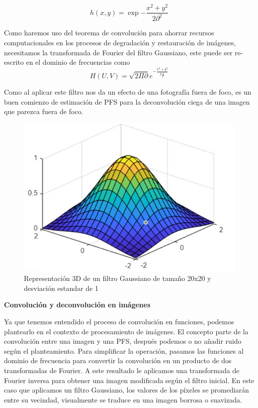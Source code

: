 \documentclass[eng]{ajceam-class}
\begin{document}
\begin{equation}
    h(x,y) = \exp{-\frac{x^2+y^2}{2\partial ^2}}
\end{equation}

Como haremos uso del teorema de convolución para ahorrar recursos computacionales en los procesos de degradación y restauración de imágenes, necesitamos la transformada de Fourier del filtro Gaussiano, este puede ser re-escrito en el dominio de frecuencias como
\begin{equation}
    H(U,V) = \sqrt{2\Pi \partial}e^{-\frac{x^2+y^2}{2\frac{1}{\delta^2}}}
\end{equation}

Como al aplicar este filtro nos da un efecto de una fotografía fuera de foco, es un buen comienzo de estimación de PFS para la deconvolución ciega de una imagen que parezca fuera de foco. \cite{Menaka_2021}

\begin{figure}[!h] 
 \centering
 \includegraphics[width=.8\columnwidth]{filtro gaussiano.png} 
 \caption{Representación 3D de un filtro Gaussiano de tamaño 20x20 y desviación estandar de 1} \label{fig-1}
\end{figure}

\textbf {Convolución y deconvolución en imágenes}
    
Ya que tenemos entendido el proceso de convolución en funciones, podemos plantearlo en el contexto de procesamiento de imágenes. El concepto parte de la convolución entre una imagen y una PFS, después podemos o no añadir ruido según el planteamiento. Para simplificar la operación, pasamos las funciones al dominio de frecuencia para convertir la convolución en un producto de dos transformadas de Fourier. A este resultado le aplicamos una transformada de Fourier inversa para obtener una imagen modificada según el filtro inicial. En este caso que aplicamos un filtro Gaussiano, los valores de los píxeles se promediarán entre su vecindad, visualmente se traduce en una imagen borrosa o suavizada. 
\end{document}
